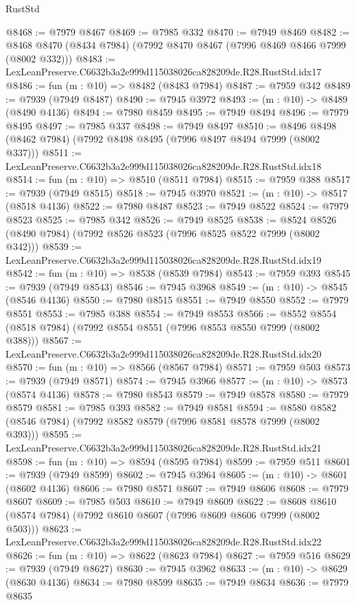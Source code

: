 \begin{lexlean}{RustStd}
\begin{coremodule}
@8468 := @7979 @8467
@8469 := @7985 @332
@8470 := @7949 @8469
@8482 := @8468 @8470 (@8434 @7984) (@7992 @8470 @8467 (@7996 @8469 @8466 @7999 (@8002 @332)))
@8483 := LexLeanPreserve.C6632b3a2e999d115038026ca828209de.R28.RustStd.idx17
@8486 := fun (m : @10) => @8482 (@8483 @7984)
@8487 := @7959 @342
@8489 := @7939 (@7949 @8487)
@8490 := @7945 @3972
@8493 := (m : @10) -> @8489 (@8490 @4136)
@8494 := @7980 @8459
@8495 := @7949 @8494
@8496 := @7979 @8495
@8497 := @7985 @337
@8498 := @7949 @8497
@8510 := @8496 @8498 (@8462 @7984) (@7992 @8498 @8495 (@7996 @8497 @8494 @7999 (@8002 @337)))
@8511 := LexLeanPreserve.C6632b3a2e999d115038026ca828209de.R28.RustStd.idx18
@8514 := fun (m : @10) => @8510 (@8511 @7984)
@8515 := @7959 @388
@8517 := @7939 (@7949 @8515)
@8518 := @7945 @3970
@8521 := (m : @10) -> @8517 (@8518 @4136)
@8522 := @7980 @8487
@8523 := @7949 @8522
@8524 := @7979 @8523
@8525 := @7985 @342
@8526 := @7949 @8525
@8538 := @8524 @8526 (@8490 @7984) (@7992 @8526 @8523 (@7996 @8525 @8522 @7999 (@8002 @342)))
@8539 := LexLeanPreserve.C6632b3a2e999d115038026ca828209de.R28.RustStd.idx19
@8542 := fun (m : @10) => @8538 (@8539 @7984)
@8543 := @7959 @393
@8545 := @7939 (@7949 @8543)
@8546 := @7945 @3968
@8549 := (m : @10) -> @8545 (@8546 @4136)
@8550 := @7980 @8515
@8551 := @7949 @8550
@8552 := @7979 @8551
@8553 := @7985 @388
@8554 := @7949 @8553
@8566 := @8552 @8554 (@8518 @7984) (@7992 @8554 @8551 (@7996 @8553 @8550 @7999 (@8002 @388)))
@8567 := LexLeanPreserve.C6632b3a2e999d115038026ca828209de.R28.RustStd.idx20
@8570 := fun (m : @10) => @8566 (@8567 @7984)
@8571 := @7959 @503
@8573 := @7939 (@7949 @8571)
@8574 := @7945 @3966
@8577 := (m : @10) -> @8573 (@8574 @4136)
@8578 := @7980 @8543
@8579 := @7949 @8578
@8580 := @7979 @8579
@8581 := @7985 @393
@8582 := @7949 @8581
@8594 := @8580 @8582 (@8546 @7984) (@7992 @8582 @8579 (@7996 @8581 @8578 @7999 (@8002 @393)))
@8595 := LexLeanPreserve.C6632b3a2e999d115038026ca828209de.R28.RustStd.idx21
@8598 := fun (m : @10) => @8594 (@8595 @7984)
@8599 := @7959 @511
@8601 := @7939 (@7949 @8599)
@8602 := @7945 @3964
@8605 := (m : @10) -> @8601 (@8602 @4136)
@8606 := @7980 @8571
@8607 := @7949 @8606
@8608 := @7979 @8607
@8609 := @7985 @503
@8610 := @7949 @8609
@8622 := @8608 @8610 (@8574 @7984) (@7992 @8610 @8607 (@7996 @8609 @8606 @7999 (@8002 @503)))
@8623 := LexLeanPreserve.C6632b3a2e999d115038026ca828209de.R28.RustStd.idx22
@8626 := fun (m : @10) => @8622 (@8623 @7984)
@8627 := @7959 @516
@8629 := @7939 (@7949 @8627)
@8630 := @7945 @3962
@8633 := (m : @10) -> @8629 (@8630 @4136)
@8634 := @7980 @8599
@8635 := @7949 @8634
@8636 := @7979 @8635

\end{coremodule}
\end{lexlean}
